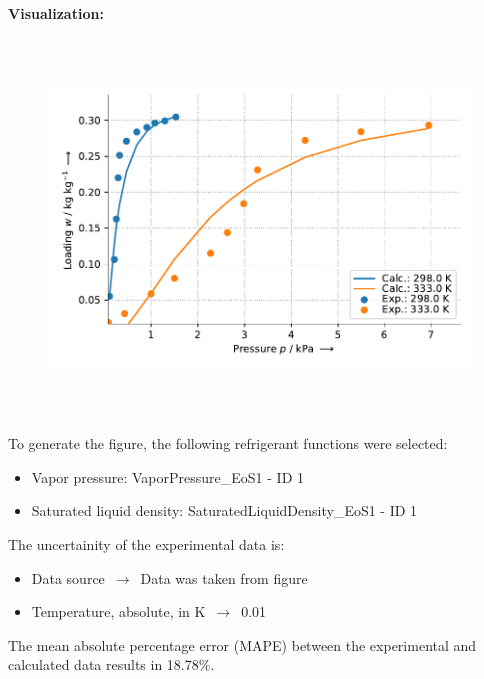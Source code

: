 \textbf{Visualization:}
%
\begin{figure}[!htp]
{\noindent\includegraphics[height=10cm, keepaspectratio]{figs/ads/ads_Water_zeotype_pellet_AQSOA-Z02_DubininAstakhov_2.pdf}}
\end{figure}
%

To generate the figure, the following refrigerant functions were selected:
\begin{itemize}
\item Vapor pressure: VaporPressure\_EoS1 - ID 1
\item Saturated liquid density: SaturatedLiquidDensity\_EoS1 - ID 1
\end{itemize}

The uncertainity of the experimental data is:
\begin{itemize}
\item Data source $\,\to\,$ Data was taken from figure
\item Temperature, absolute, in $\si{\kelvin}$ $\,\to\,$ 0.01
\end{itemize}

The mean absolute percentage error (MAPE) between the experimental and calculated data results in 18.78\%.
\FloatBarrier
\newpage
